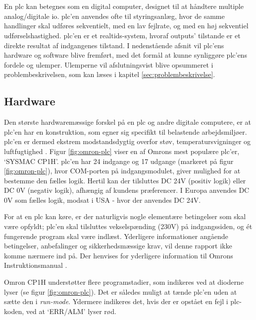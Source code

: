 \section{}
En \gls{plc} kan betegnes som en digital computer, designet til at håndtere multiple analog/digitale \gls{io}. \gls{plc}'en anvendes ofte til styringsanlæg, hvor de samme handlinger skal udføres sekventielt, med en lav fejlrate, og med en høj sekventiel udførselshastighed. \gls{plc}'en er et realtids-system, hvoraf outputs' tilstande er et direkte resultat af indgangenes tilstand. I nedenstående afsnit vil \gls{plc}'ens hardware og software blive fremført, med det formål at kunne synliggøre \gls{plc}'ens fordele og ulemper. Ulemperne vil afslutningsvist blive opsummeret i problembeskrivelsen, som kan læses i kapitel \ref{sec:problembeskrivelse}. 

\subsection{Hardware}
\label{subsec:pa-hardware}
Den største hardwaremæssige forskel på en \gls{plc} og andre digitale computere, er at \gls{plc}'en har en konstruktion, som egner sig specifikt til belastende arbejdsmiljøer. \gls{plc}'en er dermed ekstrem modstandsdygtig overfor støv, temperatursvigninger og luftfugtighed \cite{PLC_hardware_desc}. 
Figur \ref{fig:omron-plc} viser en af Omrons mest populære \gls{plc}'er, \enquote*{SYSMAC CP1H}. \gls{plc}'en har 24 indgange og 17 udgange (markeret på figur \ref{fig:omron-plc}), hvor COM-porten på indgangsmodulet, giver mulighed for at bestemme den fælles logik. Hertil kan der tilsluttes DC 24V (positiv logik) eller DC 0V (negativ logik), afhængig af kundens præferencer. I Europa anvendes DC 0V som fælles logik, modsat i USA - hvor der anvendes DC 24V. 

\noindent For at en \gls{plc} kan køre, er der naturligvis nogle elementære betingelser som skal være opfyldt; \gls{plc}'en skal tilsluttes vekselspænding (230V) på indgangssiden, og ét fungerende program skal være indlæst. Yderligere informationer angående betingelser, anbefalinger og sikkerhedsmæssige krav, vil denne rapport ikke komme nærmere ind på. Der henvises for yderligere information til Omrons Instruktionsmanual \cite{basic_knowledge_plc}.

\noindent Omron CP1H understøtter flere programstadier, som indikeres ved at dioderne lyser (se figur \ref{fig:omron-plc}). Det er således muligt at tænde \gls{plc}'en uden at sætte den i \textit{run-mode}. Ydermere indikeres det, hvis der er opstået en fejl i \gls{plc}-koden, ved at \enquote*{ERR/ALM} lyser rød. 

